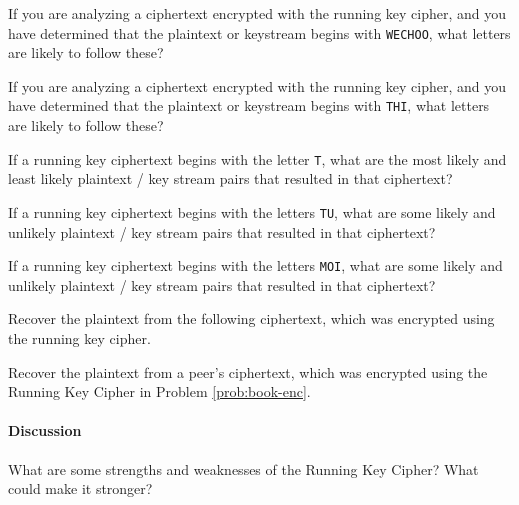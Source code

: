 \begin{problem}  [5 points]
If you are analyzing a ciphertext encrypted with the running key cipher, and you have determined that the plaintext or keystream begins with {\tt WECHOO}, what letters are likely to follow these?
\end{problem}

\begin{problem}  [5 points]
If you are analyzing a ciphertext encrypted with the running key cipher, and you have determined that the plaintext or keystream begins with {\tt THI}, what letters are likely to follow these?
\end{problem}

\begin{problem}  [10 points]
If a running key ciphertext begins with the letter {\tt T}, what are the most likely and least likely plaintext / key stream pairs that resulted in that ciphertext?
\end{problem}

\begin{problem}  [10 points]
If a running key ciphertext begins with the letters {\tt TU}, what are some likely and unlikely plaintext / key stream pairs that resulted in that ciphertext?
\end{problem}

\begin{problem}  [10 points]
If a running key ciphertext begins with the letters {\tt MOI}, what are some likely and unlikely plaintext / key stream pairs that resulted in that ciphertext?
\end{problem}

\begin{problem}  [20 points]
Recover the plaintext from the following ciphertext, which was encrypted using the running key cipher.

\end{problem}

\begin{problem}  [15 points]
Recover the plaintext from a peer's ciphertext, which was encrypted using the Running Key Cipher in Problem \ref{prob:book-enc}.
\end{problem}

	\paragraph*{Discussion} What are some strengths and weaknesses of the Running Key Cipher? What could make it stronger?

